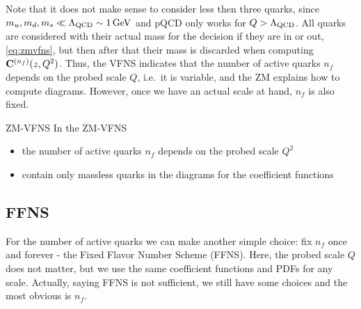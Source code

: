 Note that it does not make sense to consider less then three quarks, since $m_u,m_d,m_s \ll \LQCD \sim \SI{1}{\GeV}$ and pQCD only works for $Q > \Lambda_\text{QCD}$.
All quarks are considered with their actual mass for the decision if they are in or out, \cref{eq:zmvfns}, but then after that their mass is discarded when computing $\vb C^{(n_f)}(z,Q^2)$.
Thus, the VFNS indicates that the number of active quarks $n_f$ depends on the probed scale $Q$, i.e.\ it is variable, and the ZM explains how to compute diagrams.
However, once we have an actual scale at hand, $n_f$ is also fixed.

\begin{conclusionbox}{ZM-VFNS}
    In the ZM-VFNS
    \begin{itemize}
        \item the number of active quarks $n_f$ depends on the probed scale $Q^2$
        \item contain only massless quarks in the diagrams for the coefficient functions
    \end{itemize}
\end{conclusionbox}

\subsection{FFNS}
\label{sec:ffns}

For the number of active quarks we can make another simple choice: fix $n_f$ once and forever - the Fixed Flavor Number Scheme (FFNS).
Here, the probed scale $Q$ does not matter, but we use the same coefficient functions and PDFs for any scale.
Actually, saying FFNS is not sufficient, we still have some choices and the most obvious is $n_f$.

